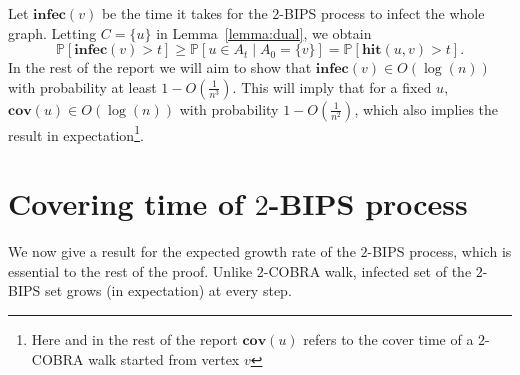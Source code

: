 \documentclass[11pt]{article}
\newcommand{\cov}{\mathbf{cov}}
\newcommand{\hit}{\mathbf{hit}}
\newcommand{\infec}{\mathbf{infec}}
\renewcommand{\Pr}{\mathbb P}
\theoremstyle{remark}
\begin{document}
Let $\infec(v)$ be the time it takes for the $2$-BIPS process to infect the whole graph. Letting $C = \{u\}$ in Lemma~\ref{lemma:dual}, we obtain \begin{equation}
\label{eq:infec}
\Pr[\infec(v) > t] \ge \Pr\left[u \in A_t \mid A_0 = \{v\} \right] = \Pr\left[\hit(u,v) > t \right].
\end{equation}
In the rest of the report we will aim to show that $\infec(v) \in O(\log(n))$ with probability at least $1 - O\left(\frac{1}{n^3}\right)$. This will imply that for a fixed $u$, $\cov(u) \in O(\log(n))$ with probability $1 - O\left(\frac{1}{n^2}\right)$, which also implies the result in expectation\footnote{Here and in the rest of the report $\cov(u)$ refers to the cover time of a $2$-COBRA walk started from vertex $v$}.

\section{Covering time of $2$-BIPS process}

We now give a result for the expected growth rate of the $2$-BIPS process, which is essential to the rest of the proof. Unlike $2$-COBRA walk, infected set of the $2$-BIPS set grows (in expectation) at every step. 
\end{document}
